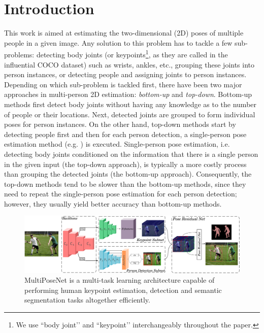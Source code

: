\documentclass[runningheads]{llncs}
\begin{document}
\section{Introduction}
This work is aimed at estimating  the two-dimensional (2D) poses of multiple people in a given image. Any solution to this problem has to tackle a few sub-problems: detecting body joints (or keypoints\footnote{We use ``body joint’’ and ``keypoint’’ interchangeably throughout the paper.}, as they are called in the influential COCO \cite{Lin2014} dataset) such as wrists, ankles, etc., grouping these joints into person instances, or detecting people and assigning joints to person instances. Depending on which sub-problem is tackled first, there have been two major approaches in multi-person 2D estimation: \textit{bottom-up} and \textit{top-down}. Bottom-up methods \cite{Cao2016, Pishchulin2015a, Insafutdinov2016, Bulata, Iqbal2016a, Ning2017, Newell2016b} first  detect body joints without having any knowledge as to the number of people or their locations. Next, detected joints are  grouped to form individual poses for person instances. On the other hand, top-down methods \cite{Chen2017a, Papandreou2017, He2017a, Fang2017} start by detecting people first and then for each person detection, a single-person pose estimation method (e.g. \cite{Wei2016, Newella, Chou2017, Huang}) is executed. Single-person pose estimation, i.e. detecting body joints conditioned on the information that there is a single person in the given input (the top-down approach), is typically a more costly process than grouping the detected joints  (the bottom-up approach). Consequently, the top-down methods tend to be slower than the bottom-up methods, since they need to repeat the single-person pose estimation for each person detection; however, they usually yield better accuracy than bottom-up methods. 


\begin{figure}
\centering
\includegraphics[width=\textwidth]{Figures/arch.pdf}
\caption{MultiPoseNet is a multi-task learning architecture capable of performing human keypoint estimation, detection and semantic segmentation tasks altogether efficiently.}
\label{fig:arch}
\end{figure}
\end{document}
